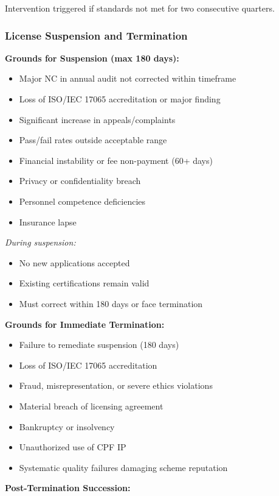 \documentclass[11pt,a4paper]{article}
\begin{document}
Intervention triggered if standards not met for two consecutive quarters.

\subsubsection{License Suspension and Termination}

\textbf{Grounds for Suspension (max 180 days):}

\begin{itemize}
\item Major NC in annual audit not corrected within timeframe
\item Loss of ISO/IEC 17065 accreditation or major finding
\item Significant increase in appeals/complaints
\item Pass/fail rates outside acceptable range
\item Financial instability or fee non-payment (60+ days)
\item Privacy or confidentiality breach
\item Personnel competence deficiencies
\item Insurance lapse
\end{itemize}

\textit{During suspension:}
\begin{itemize}
\item No new applications accepted
\item Existing certifications remain valid
\item Must correct within 180 days or face termination
\end{itemize}

\textbf{Grounds for Immediate Termination:}

\begin{itemize}
\item Failure to remediate suspension (180 days)
\item Loss of ISO/IEC 17065 accreditation
\item Fraud, misrepresentation, or severe ethics violations
\item Material breach of licensing agreement
\item Bankruptcy or insolvency
\item Unauthorized use of CPF IP
\item Systematic quality failures damaging scheme reputation
\end{itemize}

\textbf{Post-Termination Succession:}
\end{document}
